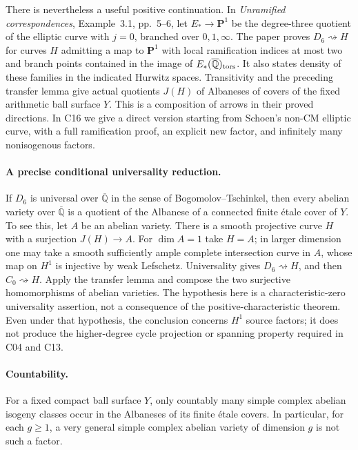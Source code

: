 \documentclass[11pt]{article}
\newcommand{\Q}{\mathbb Q}\newcommand{\C}{\mathbb C}\newcommand{\Z}{\mathbb Z}\newcommand{\R}{\mathbb R}\newcommand{\A}{\mathbb A}\newcommand{\OO}{\mathcal O}
\theoremstyle{definition}\newtheorem{definition}[theorem]{Definition}\newtheorem{remark}[theorem]{Remark}
\begin{document}
There is nevertheless a useful positive continuation.  In
\emph{Unramified correspondences}, Example~3.1, pp.~5--6, let
$E_*\to\mathbf P^1$ be the degree-three quotient of the elliptic curve
with $j=0$, branched over $0,1,\infty$.  The paper proves
$D_6\rightsquigarrow H$ for curves $H$ admitting a map to $\mathbf P^1$
with local ramification indices at most two and branch points contained in
the image of $E_*(\overline{\Q})_{\rm tors}$.  It also states density of
these families in the indicated Hurwitz spaces.  Transitivity and the
preceding transfer lemma give actual quotients $J(H)$ of Albaneses of
covers of the fixed arithmetic ball surface $Y$.  This is a composition
of arrows in their proved directions.  In C16 we give a direct version
starting from Schoen's non-CM elliptic curve, with a full ramification
proof, an explicit new factor, and infinitely many nonisogenous factors.

\paragraph{A precise conditional universality reduction.}
If $D_6$ is universal over $\overline{\Q}$ in the sense of
Bogomolov--Tschinkel, then every abelian variety over $\overline{\Q}$ is a
quotient of the Albanese of a connected finite \'{e}tale cover of $Y$.
To see this, let $A$ be an abelian variety.  There is a smooth projective
curve $H$ with a surjection $J(H)\to A$.  For $\dim A=1$ take $H=A$;
in larger dimension one may take a smooth sufficiently ample complete
intersection curve in $A$, whose map on $H^1$ is injective by weak
Lefschetz.  Universality gives $D_6\rightsquigarrow H$, and then
$C_0\rightsquigarrow H$.  Apply the transfer lemma and compose the two
surjective homomorphisms of abelian varieties.  The hypothesis here is a
characteristic-zero universality assertion, not a consequence of the
positive-characteristic theorem.  Even under that hypothesis, the conclusion
concerns $H^1$ source factors; it does not produce the higher-degree cycle
projection or spanning property required in C04 and C13.

\paragraph{Countability.}
For a fixed compact ball surface $Y$, only countably many simple complex
abelian isogeny classes occur in the Albaneses of its finite \'{e}tale
covers.  In particular, for each $g\geq1$, a very general simple complex
abelian variety of dimension $g$ is not such a factor.
\end{document}
